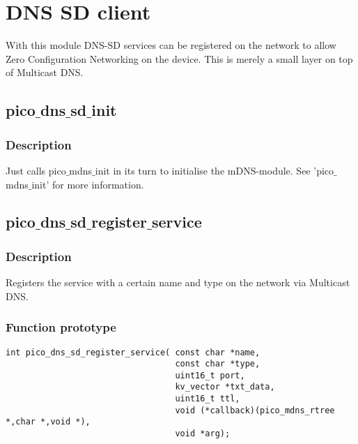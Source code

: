 \section{DNS SD client}

With this module DNS-SD services can be registered on the network to allow Zero Configuration Networking on the device. This is merely a small layer on top of Multicast DNS.

\subsection{pico$\_$dns$\_$sd$\_$init}

\subsubsection*{Description}
Just calls pico$\_$mdns$\_$init in its turn to initialise the mDNS-module. See 'pico$\_$mdns$\_$init' for more information.


\subsection{pico$\_$dns$\_$sd$\_$register$\_$service}

\subsubsection*{Description}
Registers the service with a certain name and type on the network via Multicast DNS.
\subsubsection*{Function prototype}
\begin{verbatim}
int pico_dns_sd_register_service( const char *name,
                                  const char *type,
                                  uint16_t port,
                                  kv_vector *txt_data,
                                  uint16_t ttl,
                                  void (*callback)(pico_mdns_rtree *,char *,void *),
                                  void *arg);
\end{verbatim}

